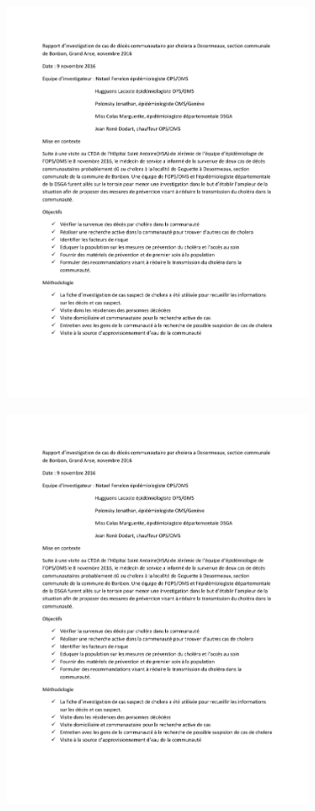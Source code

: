 \documentclass[]{tufte-handout}
\begin{document}
\begin{figure}
\includegraphics[page=1, width=0.8\textwidth]{annex/inv_desormeaux.pdf}
\end{figure}

\clearpage

\begin{figure}
\includegraphics[page=2, width=0.8\textwidth]{annex/inv_desormeaux.pdf}
\end{figure}
\end{document}
